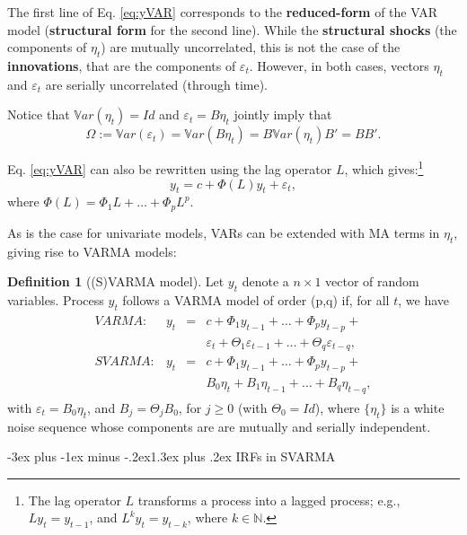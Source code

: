 \documentclass[
  11pt,
]{book}
\makeatletter
\renewcommand\section{\@startsection{section}{1}{\z@}
  {-3ex plus -1ex minus -.2ex}{1.3ex plus .2ex}
  {\normalfont\Large\bfseries\color{TextbookInk}}}
\theoremstyle{definition}
\newtheorem{definition}{Definition}[chapter]
\theoremstyle{definition}
\theoremstyle{definition}
\theoremstyle{definition}
\theoremstyle{remark}
\makeatother
\begin{document}
The first line of Eq. \eqref{eq:yVAR} corresponds to the \textbf{reduced-form} of the VAR model (\textbf{structural form} for the second line). While the \textbf{structural shocks} (the components of \(\eta_t\)) are mutually uncorrelated, this is not the case of the \textbf{innovations}, that are the components of \(\varepsilon_t\). However, in both cases, vectors \(\eta_t\) and \(\varepsilon_t\) are serially uncorrelated (through time).

Notice that \(\mathbb{V}ar(\eta_t)=Id\) and \(\varepsilon_t = B\eta_t\) jointly imply that \[
\Omega :=\mathbb{V}ar(\varepsilon_t)=\mathbb{V}ar(B\eta_t)= B  \mathbb{V}ar(\eta_t) B'=BB'.
\]

Eq. \eqref{eq:yVAR} can also be rewritten using the lag operator \(L\), which gives:\footnote{The lag operator \(L\) transforms a process into a lagged process; e.g., \(L y_t = y_{t-1}\), and \(L^k y_t = y_{t-k}\), where \(k \in \mathbb{N}\).}
\[
y_t = c + \Phi(L) y_{t} + \varepsilon_t,
\]
where \(\Phi(L)=\Phi_1 L + \dots + \Phi_p L^p\).

As is the case for univariate models, VARs can be extended with MA terms in \(\eta_t\), giving rise to VARMA models:

\begin{definition}[(S)VARMA model]
\protect\hypertarget{def:SVARMA}{}\label{def:SVARMA}Let \(y_{t}\) denote a \(n \times1\) vector of random variables. Process \(y_{t}\) follows a VARMA model of order (p,q) if, for all \(t\), we have
\begin{eqnarray}
\begin{array}{rllll}
VARMA:& y_t &=& c + \Phi_1 y_{t-1} + \dots + \Phi_p y_{t-p} + \\
&&&\varepsilon_t + \Theta_1\varepsilon_{t-1} + \dots + \Theta_q \varepsilon_{t-q},\\
SVARMA:& y_t &=& c + \Phi_1 y_{t-1} + \dots + \Phi_p y_{t-p} + \\
&&& B_0 \eta_t + B_1 \eta_{t-1} + \dots +  B_q \eta_{t-q},
\end{array}
\label{eq:yVARMA}
\end{eqnarray}
with \(\varepsilon_t = B_0\eta_t\), and \(B_j = \Theta_j B_0\), for \(j \ge 0\) (with \(\Theta_0=Id\)), where \(\{\eta_{t}\}\) is a white noise sequence whose components are are mutually and serially independent.
\end{definition}

\section{IRFs in SVARMA}\label{IRFSVARMA}
\end{document}
